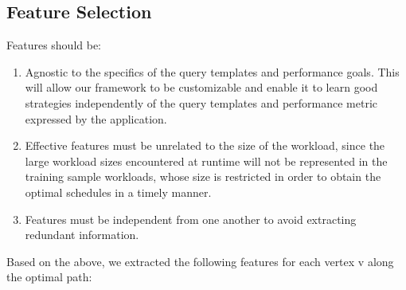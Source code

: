 \subsection{Feature Selection}
Features should be:
\begin{enumerate}
\item Agnostic to the specifics of the query templates and performance goals. This will allow our framework to be customizable and enable it to learn good strategies independently of the query templates and performance metric expressed by the application.
\item Effective features must be unrelated to the size of the workload, since the large workload sizes encountered at runtime will not be represented in the training sample workloads, whose size is restricted in order to obtain the optimal schedules in a timely manner.
\item Features must be independent from one another to avoid extracting redundant information.
\end{enumerate}
Based on the above, we extracted the following features for each vertex v along the optimal path:
